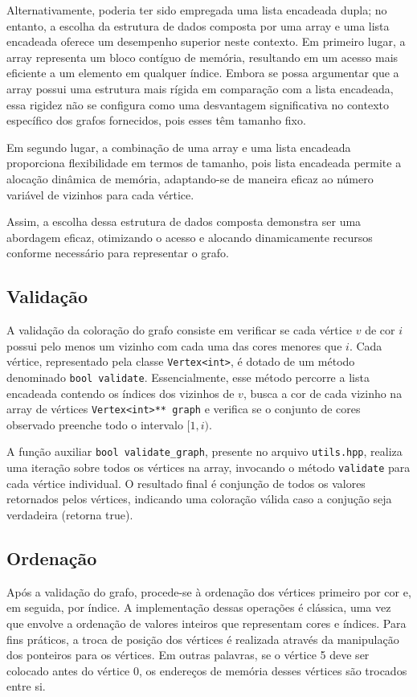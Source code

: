 \documentclass{article}
\begin{document}


Alternativamente, poderia ter sido empregada uma lista encadeada dupla; no entanto, a escolha da estrutura de dados composta por uma array e uma lista encadeada oferece um desempenho superior neste contexto. Em primeiro lugar, a array representa um bloco contíguo de memória, resultando em um acesso mais eficiente a um elemento em qualquer índice. Embora se possa argumentar que a array possui uma estrutura mais rígida em comparação com a lista encadeada, essa rigidez não se configura como uma desvantagem significativa no contexto específico dos grafos fornecidos, pois esses  têm tamanho fixo.

Em segundo lugar, a combinação de uma array e uma lista encadeada proporciona flexibilidade em termos de tamanho, pois lista encadeada permite a alocação dinâmica de memória, adaptando-se de maneira eficaz ao número variável de vizinhos para cada vértice.

Assim, a escolha dessa estrutura de dados composta demonstra ser uma abordagem eficaz, otimizando o acesso e alocando dinamicamente recursos conforme necessário para representar o grafo.


\subsection{Validação}

A validação da coloração do grafo consiste em verificar se cada vértice \(v\) de cor \(i\) possui pelo menos um vizinho com cada uma das cores menores que \(i\). Cada vértice, representado pela classe \texttt{Vertex<int>}, é dotado de um método denominado \texttt{bool validate}. Essencialmente, esse método percorre a lista encadeada contendo os índices dos vizinhos de \(v\), busca a cor de cada vizinho na array de vértices \texttt{Vertex<int>** graph} e verifica se o conjunto de cores observado preenche todo o intervalo \([1, i)\).

A função auxiliar \texttt{bool validate\_graph}, presente no arquivo \texttt{utils.hpp}, realiza uma iteração sobre todos os vértices na array, invocando o método \texttt{validate} para cada vértice individual. O resultado final é conjunção de todos os valores retornados pelos vértices, indicando uma coloração válida caso a conjução seja verdadeira (retorna true).

\subsection{Ordenação}
Após a validação do grafo, procede-se à ordenação dos vértices primeiro por cor e, em seguida, por índice. A implementação dessas operações é clássica, uma vez que envolve a ordenação de valores inteiros que representam cores e índices. Para fins práticos, a troca de posição dos vértices é realizada através da manipulação dos ponteiros para os vértices. Em outras palavras, se o vértice 5 deve ser colocado antes do vértice 0, os endereços de memória desses vértices são trocados entre si.
\end{document}
